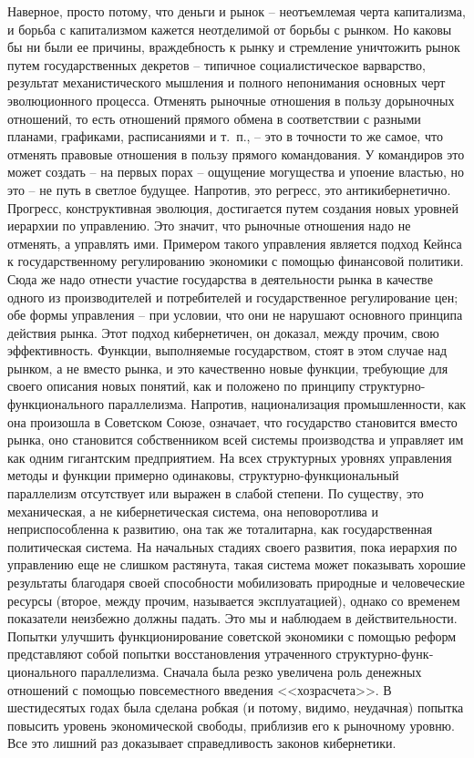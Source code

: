 \documentclass{book}
\begin{document}
Наверное, просто потому, что деньги и рынок -- неотъемле­мая черта капитализма, и борьба с капитализмом кажется неот­делимой от борьбы с рынком. Но каковы бы ни были ее причи­ны, враждебность к рынку и стремление уничтожить рынок путем государственных декретов -- типичное социалистическое варварство, результат механистического мышления и полного непонимания основных черт эволюционного процесса. Отменять рыночные отношения в пользу дорыночных отношений, то есть отношений прямого обмена в соответствии с разными планами, графиками, расписаниями и т.~п., -- это в точности то же самое, что отменять правовые отношения в пользу прямого командо­вания. У командиров это может создать -- на первых порах -- ощущение могущества и упоение властью, но это -- не путь в светлое будущее. Напротив, это регресс, это антикибернетично. Прогресс, конструктивная эволюция, достигается путем со­здания новых уровней иерархии по управлению. Это значит, что рыночные отношения надо не отменять, а управлять ими. Примером такого управления 
является подход Кейнса к госу­дарственному регулированию экономики с помощью финансо­вой политики. Сюда же надо отнести участие государства в дея­тельности рынка в качестве одного из производителей и потре­бителей и государственное регулирование цен; обе формы уп­равления -- при условии, что они не нарушают основного прин­ципа действия рынка. Этот подход кибернетичен,  он доказал, между прочим, свою эффективность. Функции, выполняемые государством, стоят в этом случае над  рынком, а не вместо рынка, и это качественно новые функции, требующие для своего описания новых понятий, как и положено по принципу струк­турно-функционального параллелизма. Напротив, национализа­ция промышленности, как она произошла в Советском Союзе, означает, что государство становится вместо  рынка, оно стано­вится собственником всей системы производства и управляет им как одним гигантским предприятием. На всех структурных уровнях управления методы и функции примерно одинаковы, структурно-функциональный параллелизм отсутствует или 
выра­жен в слабой степени. По существу, это механическая, а не ки­бернетическая система, она неповоротлива и неприспособленна к развитию, она так же тоталитарна, как государственная поли­тическая система. На начальных стадиях своего развития, пока иерархия по управлению еще не слишком растянута, такая си­стема может показывать хорошие результаты благодаря своей способности мобилизовать природные и человеческие ресурсы (второе, между прочим, называется эксплуатацией),  однако со временем показатели неизбежно должны падать. Это мы и на­блюдаем в действительности. Попытки улучшить функциони­рование советской экономики с помощью реформ представляют собой попытки восстановления утраченного структурно-функ­ционального параллелизма. Сначала была резко увеличена роль денежных отношений с помощью повсеместного введения <<хозрасчета>>. В шестидесятых годах была сделана робкая (и потому, видимо, неудачная) попытка повысить уровень экономической свободы, приблизив его к рыночному уровню. Все это лишний раз доказывает 
справедливость законов кибернетики.
\end{document}
